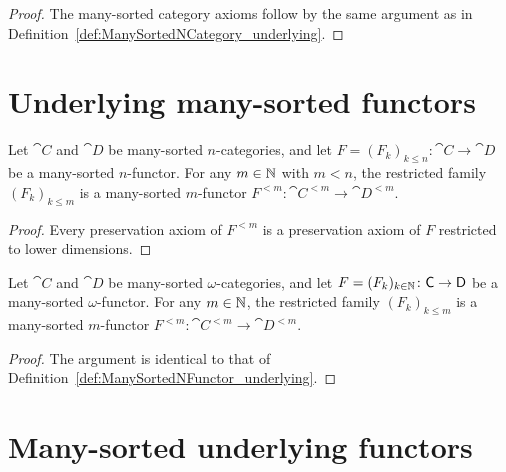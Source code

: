 \begin{proof}
  \leanok
  The many-sorted category axioms follow by the same argument as in
  Definition~\ref{def:ManySortedNCategory_underlying}.
\end{proof}

\section{Underlying many-sorted functors}

\begin{construction}
  \label{def:ManySortedNFunctor_underlying}
  \leanok
  Let $\cat{C}$ and $\cat{D}$ be many-sorted $n$-categories, and let $F = (F_k)_{k \leq n} \colon
  \cat{C} \to \cat{D}$ be a many-sorted $n$-functor. For any $m \in \mathbb{N}$ with $m < n$, the
  restricted family $(F_k)_{k \leq m}$ is a many-sorted $m$-functor $F^{<m} \colon \cat{C}^{<m} \to
  \cat{D}^{<m}$.
\end{construction}

\begin{proof}
  \leanok
  Every preservation axiom of $F^{<m}$ is a preservation axiom of $F$ restricted to lower
  dimensions.
\end{proof}

\begin{construction}
  \label{def:ManySortedOmegaFunctor_underlying}
  \leanok
  Let $\cat{C}$ and $\cat{D}$ be many-sorted $\omega$-categories, and let $F = (F_k)_{k \in \mathbb{N}}
  \colon \mathsf{C} \to \mathsf{D}$ be a many-sorted $\omega$-functor. For any $m \in \mathbb{N}$, the restricted
  family $(F_k)_{k \leq m}$ is a many-sorted $m$-functor $F^{<m} \colon \cat{C}^{<m} \to
  \cat{D}^{<m}$.
\end{construction}

\begin{proof}
  \leanok
  The argument is identical to that of Definition~\ref{def:ManySortedNFunctor_underlying}.
\end{proof}

\section{Many-sorted underlying functors}

